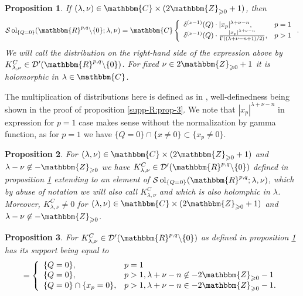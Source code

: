 \documentclass{article}
\newcommand{\nin}{\not\in}
\newcommand{\tmop}[1]{\ensuremath{\operatorname{#1}}}
\numberwithin{definition}{section}
\numberwithin{lemma}{section}
\newtheorem{proposition}{Proposition}
\numberwithin{proposition}{section}
{\theorembodyfont{\rmfamily}\newtheorem{remark}{Remark}
\numberwithin{remark}{section}
}
\begin{document}
\begin{proposition}
  \label{supp-Q:prop-onedim}If $( \lambda, \nu) \in \mathbbm{C} \times (
  2\mathbbm{Z}_{\geqslant 0} + 1)$, then
  \[ \mathcal{S} \tmop{ol}_{\{ Q = 0 \}} ( \mathbbm{R}^{p, q} \backslash \{ 0
     \} ; \lambda, \nu) =\mathbbm{C} \left\{ \begin{array}{ll}
       \delta^{( \nu - 1)} ( Q) \cdot | x_p |^{\lambda + \nu - n}, & p = 1\\
       \delta^{( \nu - 1)} ( Q) \cdot \frac{| x_p |^{\lambda + \nu -
       n}}{\Gamma ( ( \lambda + \nu - n + 1) / 2)}, & p > 1
     \end{array} \right. . \]
  We will call the distribution on the right-hand side of the expression above
  by $K_{\lambda, \nu}^C \in \mathcal{D}' ( \mathbbm{R}^{p, q} \backslash \{ 0
  \})$. For fixed $\nu \in 2\mathbbm{Z}_{\geqslant 0} + 1$ it is holomorphic
  in $\lambda \in \mathbbm{C}$.
\end{proposition}

\begin{remark}
  The multiplication of distributions here is defined as in
  {\cite{hormander1983analysis}}, well-definedness being shown in the proof of
  proposition \ref{supp-R:prop-3}. We note that $| x_p |^{\lambda + \nu - n}$
  in expression for $p = 1$ case makes sense without the normalization by
  gamma function, as for $p = 1$ we have $\{ Q = 0 \} \cap \{ x \neq 0 \}
  \subset \{ x_p \neq 0 \}$.
\end{remark}

\begin{proposition}
  \label{supp-Q:prop-sol-extending}For $( \lambda, \nu) \in \mathbbm{C} \times
  ( 2\mathbbm{Z}_{\geqslant 0} + 1)$ and $\lambda - \nu \nin
  -\mathbbm{Z}_{\geqslant 0}$ we have $K_{\lambda, \nu}^C \in \mathcal{D}' (
  \mathbbm{R}^{p, q} \backslash \{ 0 \})$ defined in proposition
  \ref{supp-Q:prop-onedim} extending to an element of $\mathcal{S}
  \tmop{ol}_{\{ Q = 0 \}} ( \mathbbm{R}^{p, q} ; \lambda, \nu)$, which by
  abuse of notation we will also call $K_{\lambda, \nu}^C$ and which is also
  holomphic in $\lambda$. Moreover, $K_{\lambda, \nu}^C \neq 0$ for $(
  \lambda, \nu) \in \mathbbm{C} \times ( 2\mathbbm{Z}_{\geqslant 0} + 1)$ and
  $\lambda - \nu \nin -\mathbbm{Z}_{\geqslant 0}$.
\end{proposition}

\begin{proposition}
  \label{supp-Q:prop-supp-xnoq0}For $K_{\lambda, \nu}^C \in \mathcal{D}' (
  \mathbbm{R}^{p, q} \backslash \{ 0 \})$ as defined in proposition
  \ref{supp-Q:prop-onedim} has its support being equal to
  \[ = \left\{ \begin{array}{ll}
       \{ Q = 0 \}, & p = 1\\
       \{ Q = 0 \}, & p > 1, \lambda + \nu - n \nin - 2\mathbbm{Z}_{\geqslant
       0} - 1\\
       \{ Q = 0 \} \cap \{ x_p = 0 \}, & p > 1, \lambda + \nu - n \in -
       2\mathbbm{Z}_{\geqslant 0} - 1.
     \end{array} \right. \]
\end{proposition}
\end{document}
